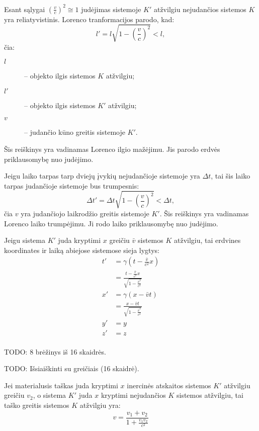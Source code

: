 Esant sąlygai $\left( \frac{v}{c} \right)^{2} \cong 1$ judėjimas
sistemoje $K'$ atžvilgiu nejudančios sistemos $K$ yra reliatyvistinis.
Lorenco tranformacijos parodo, kad:
\begin{equation*}
  l' = l \sqrt{1 - \left( \frac{v}{c} \right)^{2}} < l,
\end{equation*}
čia:
\begin{description}
  \item[$l$] – objekto ilgis sistemos $K$ atžvilgiu;
  \item[$l'$] – objekto ilgis sistemos $K'$ atžvilgiu;
  \item[$v$] – judančio kūno greitis sistemoje $K'$.
\end{description}
Šis reiškinys yra vadinamas Lorenco ilgio mažėjimu. Jis parodo
erdvės priklausomybę nuo judėjimo.

Jeigu laiko tarpas tarp dviejų įvykių nejudančioje sistemoje yra
$\Delta t$, tai šis laiko tarpas judančioje sistemoje bus
trumpesnis:
\begin{equation*}
  \Delta t'
  = \Delta t \sqrt{1 - \left( \frac{v}{c} \right)^{2}}
  < \Delta t,
\end{equation*}
čia $v$ yra judančiojo laikrodžio greitis sistemoje $K'$. Šis reiškinys
yra vadinamas Lorenco laiko trumpėjimu. Ji rodo laiko priklausomybę
nuo judėjimo.

Jeigu sistema $K'$ juda kryptimi $x$ greičiu $\bar{v}$ sistemos $K$
atžvilgiu, tai erdvines koordinates ir laiką abiejose sistemose sieja
lygtys:
\begin{align*}
  t'
  &= \gamma\left( t - \frac{\bar{v}}{c^{2}}x \right) \\
  &= \frac{t - \frac{\bar{v}}{c^{2}}x}%
    {\sqrt{1 - \frac{\bar{v}^{2}}{c^{2}}}} \\
  x'
  &= \gamma(x - \bar{v}t) \\
  &= \frac{x - \bar{v}t}{\sqrt{1 - \frac{\bar{v}^{2}}{c^{2}}}} \\
  y' &= y \\
  z' &= z \\
\end{align*}

TODO: 8 brėžinys iš 16 skaidrės.

TODO: Išsiaiškinti su greičiais (16 skaidrė).

Jei materialusis taškas juda kryptimi $x$ inercinės atskaitos sistemos
$K'$ atžvilgiu greičiu $v_{2}$, o sistema $K'$ juda $x$ kryptimi
nejudančios $K$ sistemos atžvilgiu, tai taško greitis sistemos
$K$ atžvilgiu yra:
\begin{equation*}
  v = \frac{v_{1} + v_{2}}{1 + \frac{v_{1}v_{2}}{c^{2}}}
\end{equation*}

